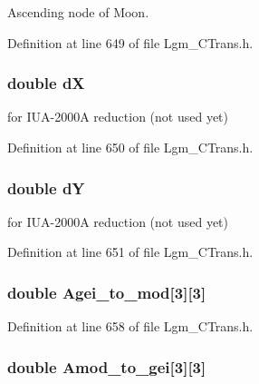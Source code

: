 Ascending node of Moon. 



Definition at line 649 of file Lgm\_\-CTrans.h.\hypertarget{struct_lgm___c_trans_5559d17f092df97e1797a76209e0caa0}{
\subsubsection[{dX}]{\setlength{\rightskip}{0pt plus 5cm}double {\bf dX}}}
\label{struct_lgm___c_trans_5559d17f092df97e1797a76209e0caa0}


for IUA-2000A reduction (not used yet) 



Definition at line 650 of file Lgm\_\-CTrans.h.\hypertarget{struct_lgm___c_trans_5b69e4344b7089d8a3c6db32a3c38551}{
\subsubsection[{dY}]{\setlength{\rightskip}{0pt plus 5cm}double {\bf dY}}}
\label{struct_lgm___c_trans_5b69e4344b7089d8a3c6db32a3c38551}


for IUA-2000A reduction (not used yet) 



Definition at line 651 of file Lgm\_\-CTrans.h.\hypertarget{struct_lgm___c_trans_88dca0b548d541262ee03936690683fb}{
\subsubsection[{Agei\_\-to\_\-mod}]{\setlength{\rightskip}{0pt plus 5cm}double {\bf Agei\_\-to\_\-mod}\mbox{[}3\mbox{]}\mbox{[}3\mbox{]}}}
\label{struct_lgm___c_trans_88dca0b548d541262ee03936690683fb}




Definition at line 658 of file Lgm\_\-CTrans.h.\hypertarget{struct_lgm___c_trans_79800e94dbb4535121f274facd8b6934}{
\subsubsection[{Amod\_\-to\_\-gei}]{\setlength{\rightskip}{0pt plus 5cm}double {\bf Amod\_\-to\_\-gei}\mbox{[}3\mbox{]}\mbox{[}3\mbox{]}}}
\label{struct_lgm___c_trans_79800e94dbb4535121f274facd8b6934}




